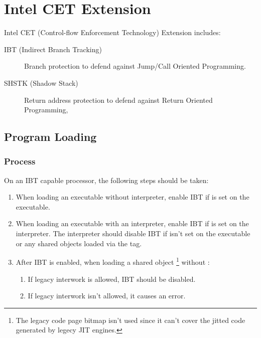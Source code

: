 \chapter{Intel CET Extension}

Intel CET (Control-flow Enforcement Technology) Extension includes:

\begin{description}
  \item[IBT (Indirect Branch Tracking)] Branch protection to defend
    against Jump/Call Oriented Programming.
  \item [SHSTK (Shadow Stack)] Return address protection to defend
    against Return Oriented Programming,
\end{description}

\section{Program Loading}

\subsection{Process }
\label{ibt}

On an IBT capable processor, the following steps should be taken:

\begin{enumerate}
  \item
    \begin{sloppypar}
      When loading an executable without interpreter, enable IBT if
       is set on the executable.
    \end{sloppypar}
  \item
    \begin{sloppypar}
      When loading an executable with an interpreter, enable IBT if
       is set on the interpreter.
      The interpreter should disable IBT if
       isn't set on the executable
      or any shared objects loaded via the  tag.
    \end{sloppypar}
  \item
    \begin{sloppypar}
      After IBT is enabled, when loading a shared object
      \footnote{The legacy code page bitmap isn't used since it can't
      cover the jitted code generated by legecy JIT engines.}
      without :
    \end{sloppypar}
    \begin{enumerate}
      \item If legacy interwork is allowed, IBT should be disabled.
      \item If legacy interwork isn't allowed, it causes an error.
    \end{enumerate}
\end{enumerate}

